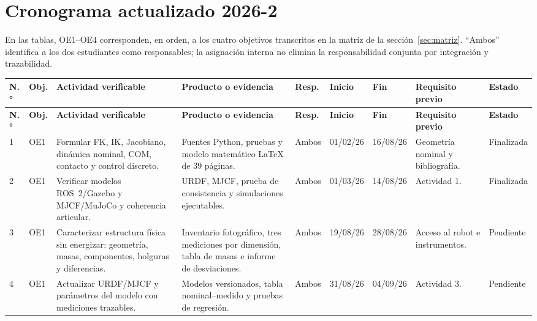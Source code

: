 \documentclass[10pt,letterpaper]{article}
\newcommand{\finalizada}{\cellcolor{verde}Finalizada}
\newcommand{\pendiente}{\cellcolor{gris}Pendiente}
\begin{document}
\section{Cronograma actualizado 2026-2}

En las tablas, OE1--OE4 corresponden, en orden, a los cuatro objetivos transcritos en la matriz de la sección~\ref{sec:matriz}. ``Ambos'' identifica a los dos estudiantes como responsables; la asignación interna no elimina la responsabilidad conjunta por integración y trazabilidad.

\begin{landscape}
\scriptsize
\setlength{\tabcolsep}{3pt}
\begin{longtable}{p{0.55cm}p{0.65cm}p{4.2cm}p{4.0cm}p{1.3cm}p{1.35cm}p{1.35cm}p{3.7cm}p{1.5cm}}
\rowcolor{azul}
\color{white}\textbf{N.°} & \color{white}\textbf{Obj.} & \color{white}\textbf{Actividad verificable} & \color{white}\textbf{Producto o evidencia} & \color{white}\textbf{Resp.} & \color{white}\textbf{Inicio} & \color{white}\textbf{Fin} & \color{white}\textbf{Requisito previo} & \color{white}\textbf{Estado}\\
\endfirsthead
\rowcolor{azul}
\color{white}\textbf{N.°} & \color{white}\textbf{Obj.} & \color{white}\textbf{Actividad verificable} & \color{white}\textbf{Producto o evidencia} & \color{white}\textbf{Resp.} & \color{white}\textbf{Inicio} & \color{white}\textbf{Fin} & \color{white}\textbf{Requisito previo} & \color{white}\textbf{Estado}\\
\endhead
1 & OE1 & Formular FK, IK, Jacobiano, dinámica nominal, COM, contacto y control discreto. & Fuentes Python, pruebas y modelo matemático LaTeX de 39 páginas. & Ambos & 01/02/26 & 16/08/26 & Geometría nominal y bibliografía. & \finalizada\\
2 & OE1 & Verificar modelos ROS~2/Gazebo y MJCF/MuJoCo y coherencia articular. & URDF, MJCF, prueba de consistencia y simulaciones ejecutables. & Ambos & 01/03/26 & 14/08/26 & Actividad 1. & \finalizada\\
3 & OE1 & Caracterizar estructura física sin energizar: geometría, masas, componentes, holguras y diferencias. & Inventario fotográfico, tres mediciones por dimensión, tabla de masas e informe de desviaciones. & Ambos & 19/08/26 & 28/08/26 & Acceso al robot e instrumentos. & \pendiente\\
4 & OE1 & Actualizar URDF/MJCF y parámetros del modelo con mediciones trazables. & Modelos versionados, tabla nominal--medido y pruebas de regresión. & Ambos & 31/08/26 & 04/09/26 & Actividad 3. & \pendiente\\

\end{longtable}
\end{landscape}
\end{document}
